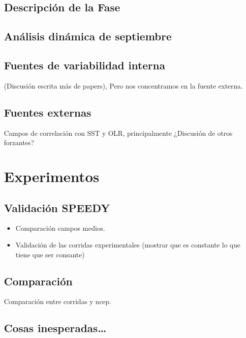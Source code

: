 \documentclass[spanish,a4paper]{book}
\providecommand{\tightlist}{%
  \setlength{\itemsep}{0pt}\setlength{\parskip}{0pt}}
\begin{document}
\section{Descripción de la Fase}\label{descripcion-de-la-fase}

\section{Análisis dinámica de
septiembre}\label{analisis-dinamica-de-septiembre}

\section{Fuentes de variabilidad
interna}\label{fuentes-de-variabilidad-interna}

(Discusión escrita más de papers), Pero nos concentramos en la fuente
externa.

\section{Fuentes externas}\label{fuentes-externas}

Campos de correlación con SST y OLR, principalmente ¿Discusión de otros
forzantes?

\chapter{Experimentos}\label{experimentos}

\section{Validación SPEEDY}\label{validacion-speedy}

\begin{itemize}
\tightlist
\item
  Comparación campos medios.
\item
  Validación de las corridas experimentales (mostrar que es constante lo
  que tiene que ser consante)
\end{itemize}

\section{Comparación}\label{comparacion}

Comparación entre corridas y ncep.

\section{Cosas inesperadas\ldots{}}\label{cosas-inesperadas}
\end{document}
